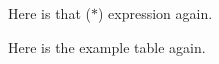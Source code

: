 \documentclass[9pt,t,serif,professionalfont,xcolor={table,dvipsnames},noamsthm]{beamer}
\begin{document}
\begin{frame}
Here is that ($*$) expression again.
%
\end{frame}

\begin{frame}
Here is the example table again.
\begin{center}
\end{center}

\end{frame}
\end{document}
